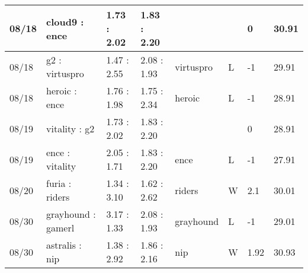 \begin{small}
\begin{longtable}{|l|l|l|l|l|l|l|l|}
	08/18                               & cloud9 : ence                       & 1.73 : 2.02                             & 1.83 : 2.20                             &                                   &                                   & 0                                    & 30.91                             \\ \hline
	08/18                               & g2 : virtuspro                      & 1.47 : 2.55                             & 2.08 : 1.93                             & virtuspro                         & L                                 & -1                                   & 29.91                             \\ \hline
	08/18                               & heroic : ence                       & 1.76 : 1.98                             & 1.75 : 2.34                             & heroic                            & L                                 & -1                                   & 28.91                             \\ \hline
	08/19                               & vitality : g2                       & 1.73 : 2.02                             & 1.83 : 2.20                             &                                   &                                   & 0                                    & 28.91                             \\ \hline
	08/19                               & ence : vitality                     & 2.05 : 1.71                             & 1.83 : 2.20                             & ence                              & L                                 & -1                                   & 27.91                             \\ \hline
	08/20                               & furia : riders                      & 1.34 : 3.10                             & 1.62 : 2.62                             & riders                            & W                                 & 2.1                                  & 30.01                             \\ \hline
	08/30                               & grayhound : gamerl                  & 3.17 : 1.33                             & 2.08 : 1.93                             & grayhound                         & L                                 & -1                                   & 29.01                             \\ \hline
	08/30                               & astralis : nip                      & 1.38 : 2.92                             & 1.86 : 2.16                             & nip                               & W                                 & 1.92                                 & 30.93                             \\ \hline

\end{longtable}
\end{small}
